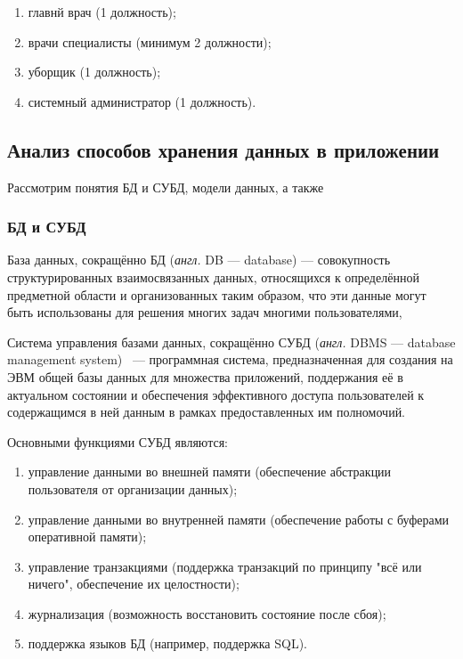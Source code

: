 \begin{enumerate}[label=\arabic*)]
	\item главнй врач (1 должность);
	\item врачи специалисты (минимум 2 должности);
	\item уборщик (1 должность);
	\item системный администратор (1 должность).
\end{enumerate}



\subsection{Анализ способов хранения данных в приложении}

Рассмотрим понятия БД и СУБД, модели данных, а также 

\subsubsection{БД и СУБД}

База данных, сокращённо БД (\textit{англ.} DB --- database) \cite{carpova} --- совокупность структурированных взаимосвязанных данных, относящихся к определённой предметной области и организованных таким образом, что эти данные могут быть использованы для решения многих задач многими пользователями,

Система управления базами данных, сокращённо СУБД (\textit{англ.} DBMS --- database management system)~\cite{carpova} --- программная система, предназначенная для создания на ЭВМ общей базы данных для множества приложений, поддержания её в актуальном состоянии и обеспечения эффективного доступа пользователей к содержащимся в ней данным в рамках предоставленных им полномочий. 

Основными функциями СУБД являются:
\begin{enumerate}[label=\arabic*)]
	\item управление данными во внешней памяти (обеспечение абстракции пользователя от организации данных);
	\item управление данными во внутренней памяти (обеспечение работы с буферами оперативной памяти);
	\item управление транзакциями (поддержка транзакций по принципу "всё или ничего", обеспечение их целостности);
	\item журнализация (возможность восстановить состояние после сбоя);
	\item поддержка языков БД (например, поддержка SQL).
\end{enumerate}


